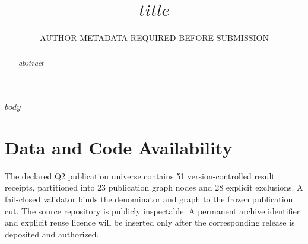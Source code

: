 \documentclass[preprint,12pt]{elsarticle}
\begin{document}
\begin{frontmatter}
\title{$title$}
\author{AUTHOR METADATA REQUIRED BEFORE SUBMISSION}
\address{AUTHOR AFFILIATION REQUIRED BEFORE SUBMISSION}
\begin{abstract}
$abstract$
\end{abstract}
\end{frontmatter}

$body$

\section*{Data and Code Availability}
The declared Q2 publication universe contains 51 version-controlled result receipts,
partitioned into 23 publication graph nodes and 28 explicit exclusions. A fail-closed
validator binds the denominator and graph to the frozen publication cut. The source
repository is publicly inspectable. A permanent archive identifier and explicit reuse
licence will be inserted only after the corresponding release is deposited and authorized.



\end{document}
